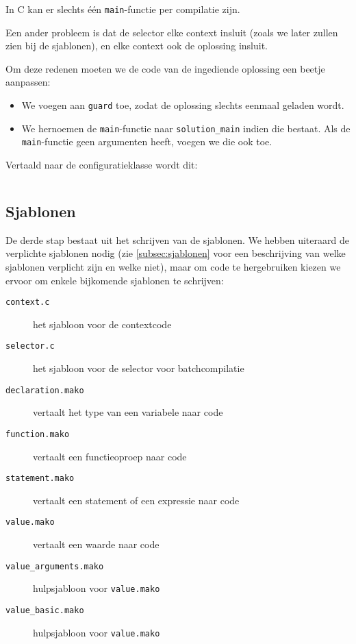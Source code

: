 In C kan er slechts één \texttt{main}-functie per compilatie zijn.

Een ander probleem is dat de selector elke context insluit (zoals we later zullen zien bij de sjablonen), en elke context ook de oplossing insluit.

Om deze redenen moeten we de code van de ingediende oplossing een beetje aanpassen:

\begin{itemize}
    \item We voegen aan \texttt{guard} toe, zodat de oplossing slechts eenmaal geladen wordt.
    \item We hernoemen de \texttt{main}-functie naar \texttt{solution\_main} indien die bestaat.
    Als de \texttt{main}-functie geen argumenten heeft, voegen we die ook toe.
\end{itemize}

Vertaald naar de configuratieklasse wordt dit:

\inputminted[firstline=25,lastline=42,gobble=4]{python}{sources/c-config.py}

\subsection{Sjablonen}\label{subsec:manual-sjablonen}

De derde stap bestaat uit het schrijven van de sjablonen.
We hebben uiteraard de verplichte sjablonen nodig (zie \cref{subsec:sjablonen} voor een beschrijving van welke sjablonen verplicht zijn en welke niet), maar om code te hergebruiken kiezen we ervoor om enkele bijkomende sjablonen te schrijven:

\begin{description}
    \item[\texttt{context.c}] het sjabloon voor de contextcode
    \item[\texttt{selector.c}] het sjabloon voor de selector voor batchcompilatie
    \item[\texttt{declaration.mako}] vertaalt het type van een variabele naar code
    \item[\texttt{function.mako}] vertaalt een functieoproep naar code
    \item[\texttt{statement.mako}] vertaalt een statement of een expressie naar code
    \item[\texttt{value.mako}] vertaalt een waarde naar code
    \item[\texttt{value\_arguments.mako}] hulpsjabloon voor \texttt{value.mako}
    \item[\texttt{value\_basic.mako}] hulpsjabloon voor \texttt{value.mako}
\end{description}


